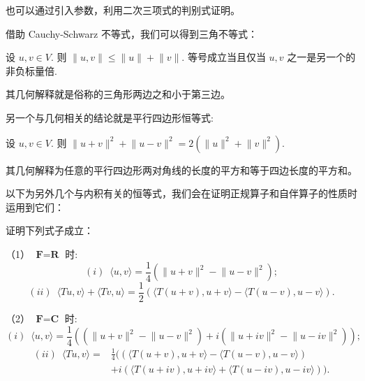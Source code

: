 也可以通过引入参数，利用二次三项式的判别式证明。

\vspace{2ex}

借助 Cauchy-Schwarz 不等式，我们可以得到三角不等式：

\begin{theorem}
    设 $u, v \in V$. 则 $\lVert u, v \rVert \leqslant \lVert u \rVert + \lVert v \rVert$.
    等号成立当且仅当 $u, v$ 之一是另一个的非负标量倍.
\end{theorem}

其几何解释就是俗称的三角形两边之和小于第三边。

\vspace{2ex}

另一个与几何相关的结论就是平行四边形恒等式:

\begin{theorem}
    设 $u, v \in V$. 则 $ \lVert u + v \rVert^{2} + \lVert u - v \rVert^{2} = 2(\lVert u \rVert^{2} + \lVert v \rVert^{2})$.
\end{theorem}

其几何解释为任意的平行四边形两对角线的长度的平方和等于四边长度的平方和。

\vspace{2ex}


以下为另外几个与内积有关的恒等式，我们会在证明正规算子和自伴算子的性质时运用到它们：

\begin{example}
    证明下列式子成立：

    \textup{（1）} $\textbf{F} = \textbf{R}$ 时:
    \[(i) \enspace \langle u, v\rangle  = \frac{1}{4}\left( \lVert u + v \rVert^2 - \lVert u - v \rVert^2\right);\]
    \[(ii) \enspace \langle Tu, v\rangle + \langle Tv, u\rangle = 
    \frac{1}{2}\left(\langle T(u + v), u + v\rangle - \langle T(u - v), u - v\rangle\right).\]

    \textup{（2）} $\textbf{F} = \textbf{C}$ 时:
    \[(i) \enspace \langle u, v\rangle  = \frac{1}{4}\left( (\lVert u + v \rVert^2 - \lVert u - v \rVert^2) + i(\lVert u + iv \rVert^2 - \lVert u - iv \rVert^2) \right);\]
    \begin{align*}
        (ii) \enspace \langle Tu, v\rangle = & \frac{1}{4}  ((\langle T(u + v), u + v\rangle - \langle T(u - v), u - v\rangle) \\ 
                                             & + i(\langle T(u + iv), u + iv\rangle + \langle T(u - iv), u - iv\rangle)).
    \end{align*}

\end{example}


